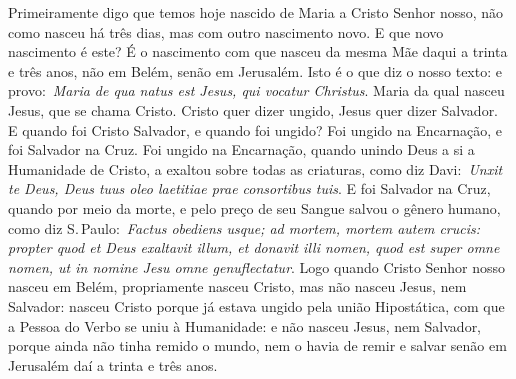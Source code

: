 Primeiramente digo que temos hoje nascido de Maria a Cristo
Senhor nosso, não como nasceu há três dias, mas com outro nascimento
novo. E que novo nascimento é este? É o nascimento com que nasceu da
mesma Mãe daqui a trinta e três anos, não em Belém, senão em Jerusalém.
Isto é o que diz o nosso texto: e provo:~\emph{Maria de qua natus est
Jesus, qui vocatur Christus}. Maria da qual nasceu Jesus, que se chama
Cristo. Cristo quer dizer ungido, Jesus quer dizer Salvador. E quando
foi Cristo Salvador, e quando foi ungido? Foi ungido na Encarnação, e
foi Salvador na Cruz. Foi ungido na Encarnação, quando unindo Deus a si
a Humanidade de Cristo, a exaltou sobre todas as criaturas, como diz
Davi:~\emph{Unxit te Deus, Deus tuus oleo laetitiae prae consortibus
tuis}. E foi Salvador na Cruz, quando por meio da
morte, e pelo preço de seu Sangue salvou o gênero humano, como diz S.\,Paulo:~\emph{Factus obediens usque; ad mortem, mortem autem crucis:
propter quod et Deus exaltavit illum, et donavit illi nomen, quod est
super omne nomen, ut in nomine Jesu omne
genuflectatur}. Logo quando Cristo Senhor nosso nasceu
em Belém, propriamente nasceu Cristo, mas não nasceu Jesus, nem
Salvador: nasceu Cristo porque já estava ungido pela união Hipostática,
com que a Pessoa do Verbo se uniu à Humanidade: e não nasceu Jesus, nem
Salvador, porque ainda não tinha remido o mundo, nem o havia de remir e
salvar senão em Jerusalém daí a trinta e três anos.


